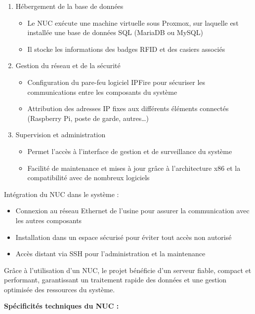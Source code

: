 \documentclass[main.tex]{subfiles}
\begin{document}
\begin{enumerate}
\item Hébergement de la base de données
\begin{itemize}
\item Le NUC exécute une machine virtuelle sous Proxmox, sur laquelle est installée une base de données SQL (MariaDB ou MySQL)
\item Il stocke les informations des badges RFID et des casiers associés
\end{itemize}
\item Gestion du réseau et de la sécurité
\begin{itemize}
\item Configuration du pare-feu logiciel IPFire pour sécuriser les communications entre les composants du système
\item Attribution des adresses IP fixes aux différents éléments connectés (Raspberry Pi, poste de garde, autres…)
\end{itemize}
\item Supervision et administration
\begin{itemize}
\item Permet l’accès à l’interface de gestion et de surveillance du système
\item Facilité de maintenance et mises à jour grâce à l’architecture x86 et la compatibilité avec de nombreux logiciels
\end{itemize}
\end{enumerate}

Intégration du NUC dans le système :

\begin{itemize}
\item Connexion au réseau Ethernet de l’usine pour assurer la communication avec les autres composants
\item Installation dans un espace sécurisé pour éviter tout accès non autorisé
\item Accès distant via SSH pour l’administration et la maintenance
\end{itemize}

Grâce à l’utilisation d’un NUC, le projet bénéficie d’un serveur fiable, compact et performant, garantissant un traitement rapide des données et une gestion optimisée des ressources du système.

\textbf{Spécificités techniques du NUC :}
\end{document}
